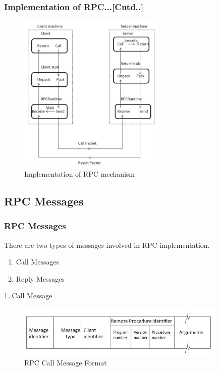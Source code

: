 \documentclass{beamer}
\begin{document}
\begin{frame}
	\frametitle{Implementation of RPC...[Cntd..]}
	\begin{figure}
		\centering
		\includegraphics[width=7cm]{fig42.jpg}
		\caption{Implementation of RPC mechanism}
	\end{figure}
\end{frame}



\subsection{RPC Messages}
\begin{frame}
	\frametitle{RPC Messages}
	There are two types of messages involved in RPC implementation.
	\begin{enumerate}
		\item Call Messages
		\item Reply Messages
	\end{enumerate}
	\vspace{1cm}
	1. Call Message\\
	\begin{figure}
		\centering
		\includegraphics[width=10cm]{fig43.jpg}
		\caption{RPC Call Message Format}
	\end{figure}
\end{frame}
\end{document}
